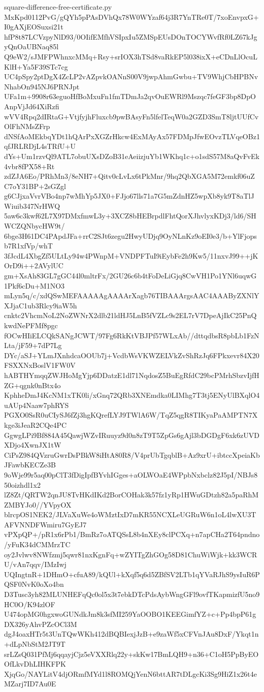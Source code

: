 \documentclass[11pt]{article}
\theoremstyle{definition}
\theoremstyle{remark}
\begin{document}
\begin{filecontents*}[overwrite]{square-difference-free-certificate.py}
MxKpd0112PvG/gQYh5pPAsDVhQx78W0WYzaf64j3R7YnTRe0T/7xoEnvpxG+I0gAXjEOSuxsi21t
hfP8t87LCVzpyNlD93/0OIifEMfhVSIpxIu5ZMSpEUsDOnTOCYWvfRf0LZ67kJgyQnOaUBNaq85l
Q9eW2/sJMFPWhnxcMMq+Rsy+srIOX3hTSd8vaRkEP5l038ixX+eCDnLlOcuLKlH+Ya5F39STc7cg
UC4pSpy2ptDgX4ZcLP2vAZpvkOANnS00V9jwpAhmGwbu+TV9WhjCbHPBNvNhabOn945NJ6PRNJpt
UFa1m+9908r63eguoHfBoMxuFn1fmTDmJa2qvOuEWRl9Mszqc7feGF3bp8DpOAnpVjJd64XiRzfi
wVV4Rpq2dIRtaG+VtjfyjhFluxcb9pwBAsyFn5lfelTeqW0a2GZD3SmT8ljtUUfCvOlFhNMsZFrp
dNSfAoMEkbqYDt1hQArPxXGZrHkcw4ExMAyAx57FDMpJfwEOvzTLVqeOBz1qfJRLRDjL4sTRfU+U
dYs+Um1rzvQl9ATL7obuUXsDZoB31eAeiizjuYb1WKhq1c+o1sdS57M8aQvFvEk4vbr8fPX58+Rt
zdZJA6Eo/PRhMn3/8eNH7+Qitv0cLvLx6tPkMnr/9hq2QbXGA5M72emkf06uZC7oY31BP+2sGZgl
g6CJjxaVvrVBo4np7wMhYp5JX0+FJjo67lls71a7G5mZdnHZ5wpXb8yk9T8aTlJWiuib347NrHWQ
5aw6c3kwf62L7X97DMxfmwL3y+3XCZ8bHEBrpdlFhtQorXJhvlyxKDj3/ld6/SHWCZQNbycHW9t/
6bge3H61DC4PApdJFa+rrC2SJt6zegu2HwyUDjq9OyNLnKz9oEI0e3/b+YlFjopsb7R1xfVp/whT
3fJcdL4XbgZf5ULtLy94w4PWnpM+VNDPFTuI9iEybFe2h9Kw5/11nxvJ99++jKOrD9i++2AVylUC
gm+XsAh83GL7gGC44l0mltrFx/2GU26c6b4tFoDeLiGjq8CwVH1Po1YNl6uqwG1Pkf6cDu+M1NO3
mLyn5q/c/xdQSwMEFAAAAAgAAAArXagb76TIBAAArgsAAC4AAAByZXNlYXJjaC1ub3Rlcy9iaW5h
cnktc2VhcmNoL2NoZWNrX2dlb21ldHJ5LnB5fVZLc9s2EL7rV7DpeAjIkC25PnQkwdNePFMf8pgc
fOCwHIiELCQkSANgJCWT/97Fg6RkKtVBJPf57WLxAb//dttqdbsR8pbLb1FzNLta/jF59+7dP7Lg
DYc/aSJ+YLmJXnhdcaOOUb7j+VcdbWsVKWZELVkZvShRzJq6FPkxevr84X20FSXXNxBoslV1FW0V
hABTHYmqqZWJHoMgYjp6DDatzE1dl71NqdosZ5BuEgRfdC29bcPMrhSbzvIjfHZG+qgnk0nBtx4o
KphheDmJ4KcNM1xTK0li/xGnq72QRb3XNEmdka0LIMhg7T3tj5ENyUlBXqlO4uAUp4Naaw7phRYS
PGXO0SsR0uCIySJ6fZj3hgKQrefLYJ9TWlA6W/TqZ5qgR8TIKyaPaAMPTN7Xkge3iJeaR2CQe4PC
GgwgLPi9Bf884A45QawjWZvIRuuyz9d0n8zT9T5ZpGs6gAjl3bDGDgF6xk6zUVDXDjo4XwnJX1tW
CiPsZ984QVzruGwrDsPBkW8iHtA80R8/V4prUbTgqblB+Az9xrU+ibtccXpeiaKbJFawbKECZe3B
9oWje99r5aq00pClT3fDigIpfBYvhIGges+aOLWOaE4WPpbNxbclz82J5pI/NBJs850oizhdl1x2
lZ8Zt/QRTW2qnJU8TvHKdIKd2BorCOHak3k57fz1yRp1HWuGDtzh82a5paRhMZMBYJo0//YVpyOX
blrcpOS1NEK2/JLVaXuWe4oWMztIxD7mKR55NCXLeUGRuW6n1oL4lwXU3TAFVNNDFWmiru7GyEJ7
vPXpQP+/pR1x6rPb1/BmRz7oATQSsL8b4nXEy8clPCXq+n7apCHa2T64pndno/yFuK34dCMMrzTC
oy2Jvlwv8NWfzmj5qwr81nxKgnFq+wZYITgZhGOg58D81ChuWiWjk+kk3WCRU/vAn7qqv/IMzIwj
UQIngtnR+1DHmO+cfuA89/kQUl+kXqf5q6d5ZBfSV2LTb1qYVaRJhS9ysIuR6PQSF0NvK0oXo4bn
D3Tusc3yh82MLUNHEFqQc0ol5x3t7ebkDTcPdsAybWngGFl9ovfTKapmizfU5no9HC0O/K94zlOF
U474opMG0hgxwoGUNdkJm8k3sfMI259YaOOBO1KEEGimfYZ+c+Pp4bpP61gDX326yAhvPZcOCl3M
dgJ4oaxHTr5t3UnTQwWKh412dBQBIexjJzB+e9zaWf5xCFVnJAu8DxF/Ykqt1n+dLpNbStM2JT9T
srLZsQ031PfMj6qqayjCjz5eVXXRlq22y+skKw17BmLQH9+n36+C1oH5PpByEOOfLkvDhLIHKFPK
XjqGo/NAYLitV4djORmfMYd1l8ROMQjYenN6bttAR7tDLgcKi3Sg9HiZ1x26t4eMZarj7ID7Au0E

\end{filecontents*}
\end{document}
